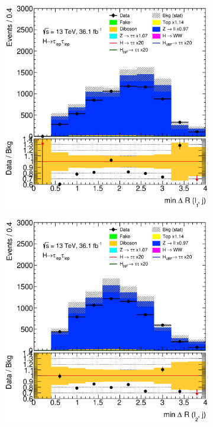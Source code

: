 \begin{figure}[htb]
\begin{subfigure}[t]{0.3\textwidth}
    \end{subfigure}
    \begin{subfigure}[t]{0.3\textwidth}
        \includegraphics[width=\textwidth]{./plots/mva/modeling/input_vars/VBF_CR/ll-CutMVAVBFCatZllCR-dRminLep0Jet-lin.eps}
    \end{subfigure}
    \begin{subfigure}[t]{0.3\textwidth}
        \includegraphics[width=\textwidth]{./plots/mva/modeling/input_vars/VBF_CR/ll-CutMVAVBFCatZllCR-dRminLep1Jet-lin.eps}

\end{subfigure}
\end{figure}
